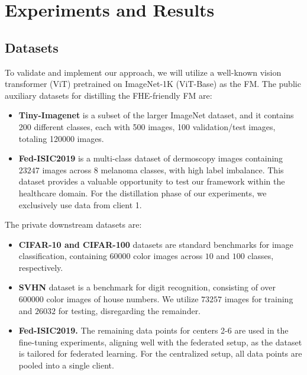 \section{Experiments and Results} 
\label{section: experiments} 


\subsection{Datasets} 

To validate and implement our approach, we will utilize a well-known vision transformer (ViT) pretrained on ImageNet-1K (ViT-Base) as the FM. 
The public auxiliary datasets for distilling the FHE-friendly FM are: 
\begin{itemize}
    \item \textbf{Tiny-Imagenet} \cite{le2015tiny} is a subset of the larger ImageNet dataset, and it contains  200 different classes, each with 500 images, 100 validation/test images, totaling 120000 images. 
    \item \textbf{Fed-ISIC2019} \cite{terrail2022flamby} is a multi-class dataset of dermoscopy images containing $23247$ images across $8$ melanoma classes, with high label imbalance. This dataset provides a valuable opportunity to test our framework within the healthcare domain. For the distillation phase of our experiments, we exclusively use data from client 1. 
\end{itemize}
The private downstream datasets are: 
\begin{itemize} 
    \item \textbf{CIFAR-10 and CIFAR-100} \cite{krizhevsky2009learning} datasets are standard benchmarks for image classification, containing $60000$ color images across $10$ and $100$ classes, respectively. 
    \item \textbf{SVHN} \cite{netzer2011reading} dataset is a benchmark for digit recognition, consisting of over $600000$ color images of house numbers. We utilize $73257$ images for training and $26032$ for testing, disregarding the remainder. 
    \item \textbf{Fed-ISIC2019.} The remaining data points for centers 2-6 are used in the fine-tuning experiments, aligning well with the federated setup, as the dataset is tailored for federated learning. For the centralized setup, all data points are pooled into a single client. 
\end{itemize}


